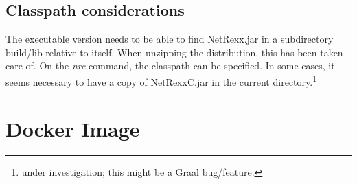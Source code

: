 \subsection{Classpath considerations}
The executable version needs to be able to find NetRexx.jar in a subdirectory build/lib relative to itself. When unzipping the distribution, this has been taken care of. On the \emph{nrc} command, the classpath can be specified. In some cases, it seems necessary to have a copy of NetRexxC.jar in the current directory.\footnote{under investigation; this might be a Graal bug/feature.}
\section{Docker Image}


